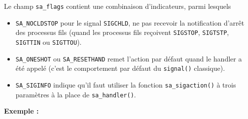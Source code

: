Le champ \texttt{sa\_flags} contient une combinaison d'indicateurs, 
parmi lesquels
\begin{itemize}
\item \texttt{SA\_NOCLDSTOP} pour le signal \texttt{SIGCHLD}, ne pas 
recevoir la notification d'arrêt des processus fils 
(quand les processus fils reçoivent
\texttt{SIGSTOP},
\texttt{SIGTSTP}, \texttt{SIGTTIN} ou \texttt{SIGTTOU}).

\item \texttt{SA\_ONESHOT} ou \texttt{SA\_RESETHAND}
remet l'action par défaut quand le handler a été appelé
(c'est le comportement par défaut du  \texttt{signal()} classique).

\item \texttt{SA\_SIGINFO} indique qu'il faut utiliser la fonction
\texttt{sa\_sigaction()} à trois paramètres à la place de
\texttt{sa\_handler()}.
\end{itemize}

\textbf{Exemple : }

\source

